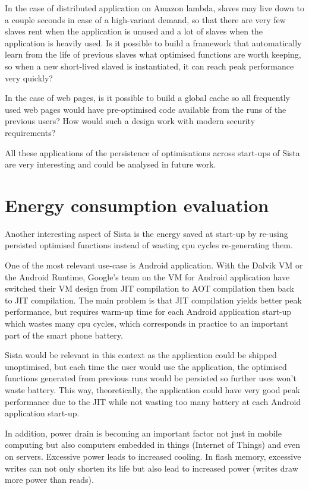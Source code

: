 \documentclass[a4paper,12pt,twoside]{../includes/ThesisStyle}
\begin{document}
In the case of distributed application on Amazon lambda, slaves may live down to a couple seconds in case of a high-variant demand, so that there are very few slaves rent when the application is unused and a lot of slaves when the application is heavily used. Is it possible to build a framework that automatically learn from the life of previous slaves what optimised functions are worth keeping, so when a new short-lived slaved is instantiated, it can reach peak performance very quickly?

In the case of web pages, is it possible to build a global cache so all frequently used web pages would have pre-optimised code available from the runs of the previous users? How would such a design work with modern security requirements?

All these applications of the persistence of optimisations across start-ups of Sista are very interesting and could be analysed in future work.

\section{Energy consumption evaluation}
\label{sec:energy}

Another interesting aspect of Sista is the energy saved at start-up by re-using persisted optimised functions instead of wasting cpu cycles re-generating them. 

One of the most relevant use-case is Android application. With the Dalvik VM or the Android Runtime, Google's team on the VM for Android application have switched their VM design from JIT compilation to AOT compilation then back to JIT compilation. The main problem is that JIT compilation yields better peak performance, but requires warm-up time for each Android application start-up which wastes many cpu cycles, which corresponds in practice to an important part of the smart phone battery.

Sista would be relevant in this context as the application could be shipped unoptimised, but each time the user would use the application, the optimised functions generated from previous runs would be persisted so further uses won't waste battery. This way, theoretically, the application could have very good peak performance due to the JIT while not wasting too many battery at each Android application start-up.

In addition, power drain is becoming an important factor not just in mobile computing but also computers embedded in things (Internet of Things) and even on servers. Excessive power leads to increased cooling. In flash memory, excessive writes can not only shorten its life but also lead to increased power (writes draw more power than reads).
\end{document}
